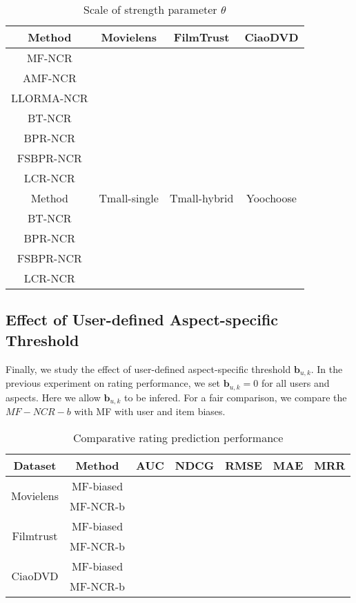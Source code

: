 \documentclass[letterpaper]{article} %
\begin{document}
 

\begin{table}[htp]
\tiny
\caption{Scale of strength parameter $\theta$}
\begin{center}
\begin{tabular}{|c|c|c|c|}
\hline
Method & Movielens & FilmTrust & CiaoDVD \\\hline
MF-NCR & & & \\\hline
AMF-NCR & & & \\\hline
LLORMA-NCR & & & \\\hline
BT-NCR & & & \\\hline
BPR-NCR & & & \\\hline
FSBPR-NCR & & & \\\hline
LCR-NCR & & & \\\hline
Method & Tmall-single & Tmall-hybrid & Yoochoose \\\hline
BT-NCR & & & \\\hline
BPR-NCR & & & \\\hline
FSBPR-NCR & & & \\\hline
LCR-NCR & & & \\\hline
\end{tabular}
\end{center}
\label{tab:theta}
\end{table}%


\subsection{Effect of User-defined Aspect-specific Threshold}

Finally, we study the effect of user-defined aspect-specific threshold $\mathbf{b}_{u,k}$. In the previous experiment on rating performance, we set $\mathbf{b}_{u,k}=0$ for all users and aspects. Here we allow $\mathbf{b}_{u,k}$ to be infered. For a fair comparison, we compare the $MF-NCR-b$ with MF with user and item biases.  

\begin{table}[htp]
\tiny
\caption{Comparative rating prediction performance}
\begin{center}
\begin{tabular}{|c|c|c|c|c|c|c|}
\hline
Dataset & Method & AUC & NDCG & RMSE & MAE & MRR \\\hline
\multirow{2}{*}{Movielens} & MF-biased &  & 	 &	 &	 &	 
 \\\cline{2-7}
 & MF-NCR-b & & 	 &	 &	 &	 
 \\\hline
\multirow{2}{*}{Filmtrust} & MF-biased & &	 &	 	&  &	 
 \\\cline{2-7}
 & MF-NCR-b &  & 	 &	 & 	 & 	 
\\\hline
 \multirow{2}{*}{CiaoDVD} & MF-biased & & 	 &	 & 	 	 &  
\\\cline{2-7}
 & MF-NCR-b & & 	 &	 &	 	&  
 \\\hline
\end{tabular}
\end{center}
\label{tab:biasresult}
\end{table}%
\end{document}
